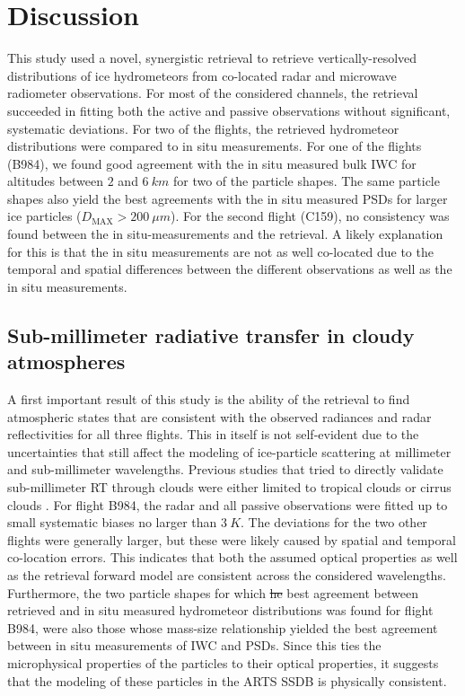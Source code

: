 \documentclass[journal abbreviation, manuscript]{copernicus}
\providecommand{\DIFadd}[1]{{\protect\color{blue}\uwave{#1}}} %
\providecommand{\DIFdel}[1]{{\protect\color{red}\sout{#1}}}                      %
\providecommand{\DIFaddbegin}{} %
\providecommand{\DIFaddend}{} %
\providecommand{\DIFdelbegin}{} %
\providecommand{\DIFdelend}{} %
\begin{document}
\section{Discussion}
\label{sec:discussion}

This study used a novel, synergistic retrieval to retrieve vertically-resolved
distributions of ice hydrometeors from co-located radar and microwave radiometer
observations. For most of the considered channels, the retrieval succeeded in
fitting both the active and passive observations without significant, systematic
deviations. For two of the flights, the retrieved hydrometeor distributions were
compared to in situ measurements. For one of the flights (B984), we found good
agreement with the in situ measured bulk IWC for altitudes between $2$ and
$6\ \unit{km}$ for two of the particle shapes. The same particle shapes also
yield the best agreements with the in situ measured PSDs for larger ice
particles ($D_\text{MAX} > 200\ \unit{\mu m}$). For the second flight (C159), no
consistency was found between the in situ-measurements and the retrieval. A
likely explanation for this is that the in situ measurements are not as well
co-located due to the temporal and spatial differences between the different
observations as well as the in situ measurements.

\subsection{Sub-millimeter radiative transfer in cloudy atmospheres}

 A first important result of this study is the ability of the retrieval to find
 atmospheric states that are consistent with the observed radiances and radar
 reflectivities for all three flights. This in itself is not self-evident due to
 the uncertainties that still affect the modeling of ice-particle scattering at
 millimeter and sub-millimeter wavelengths. Previous studies that tried to
 directly validate sub-millimeter RT through clouds were either limited to
 tropical clouds \citep{evans05, eriksson07} or cirrus clouds \citep{fox17}. For
 flight B984, the radar and all passive observations were fitted up to small
 systematic biases no larger than $3\ \unit{K}$. The deviations for the two
 other flights were generally larger, but these were likely caused by spatial
 and temporal co-location errors. This indicates that both the assumed optical
 properties as well as the retrieval forward model are consistent across the
 considered wavelengths. Furthermore, the two particle shapes for which \DIFdelbegin \DIFdel{he }\DIFdelend \DIFaddbegin \DIFadd{the }\DIFaddend best
 agreement between retrieved and in situ measured hydrometeor distributions was
 found for flight B984, were also those whose mass-size relationship yielded the
 best agreement between in situ measurements of IWC and PSDs. Since this ties
 the microphysical properties of the particles to their optical properties, it
 suggests that the modeling of these particles in the ARTS SSDB is physically
 consistent.
\end{document}

